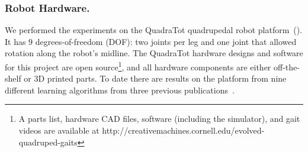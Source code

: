 \subsubsection{Robot Hardware.}

We performed the experiments on the QuadraTot quadrupedal robot platform~().
It has 9 degrees-of-freedom (DOF): two joints per leg and one joint that allowed rotation along the robot's midline. %
The QuadraTot hardware designs and software for this project are open source\footnote{A parts list, hardware CAD files, software (including the simulator), and gait videos are available at http://creativemachines.cornell.edu/evolved-quadruped-gaits}, and all hardware components are either off-the-shelf or 3D printed parts. %
To date there are results on the platform from nine different learning algorithms from three previous publications~\cite{yos:clune,glette,haocheng}. 

